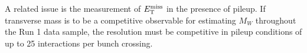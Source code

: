 A related issue is the measurement of $E_{\mathrm{T}}^{\mathrm{miss}}$ in the presence of
pileup.  If transverse mass is to be a competitive observable for
estimating $M_W$ throughout the Run 1 data sample, the resolution must
be competitive in pileup conditions of up to 25 interactions per bunch
crossing.  







